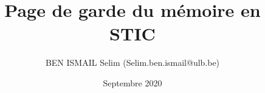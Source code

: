 
\usepackage[utf8]{inputenc}
\usepackage[T1]{fontenc}
\usepackage[french]{babel}

\usepackage{array} %
\usepackage{setspace} %
\onehalfspacing %
\usepackage{fourier} %
\title{Page de garde du mémoire en STIC}
\author{BEN ISMAIL Selim (Selim.ben.ismail@ulb.be)}
\date{Septembre 2020}
